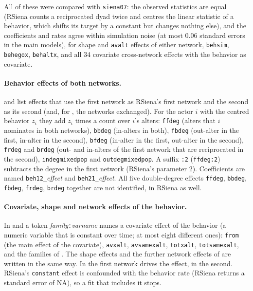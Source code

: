All of these were compared with \texttt{siena07}: the observed statistics are equal (RSiena counts a reciprocated dyad twice and centres the linear statistic of a behavior, which shifts its target by a constant but changes nothing else), and the coefficients and rates agree within simulation noise (at most 0.06 standard errors in the main models), for shape and \texttt{avalt} effects of either network, \texttt{behsim}, \texttt{behegox}, \texttt{behaltx}, and all 34 covariate cross-network effects with the behavior as covariate.

\paragraph{Behavior effects of both networks.}  and  list effects that use the first network as RSiena's first network and the second as its second (and, for , the networks exchanged). For the actor $i$ with the centred behavior $z_i$ they add $z_i$ times a count over $i$'s alters: \texttt{ffdeg} (alters that $i$ nominates in both networks), \texttt{bbdeg} (in-alters in both), \texttt{fbdeg} (out-alter in the first, in-alter in the second), \texttt{bfdeg} (in-alter in the first, out-alter in the second), \texttt{frdeg} and \texttt{brdeg} (out- and in-alters of the first network that are reciprocated in the second), \texttt{indegmixedpop} and \texttt{outdegmixedpop}. A suffix \texttt{:2} (\texttt{ffdeg:2}) subtracts the degree in the first network (RSiena's parameter 2). Coefficients are named \texttt{beh12\_}\emph{effect} and \texttt{beh21\_}\emph{effect}. All five double-degree effects \texttt{ffdeg}, \texttt{bbdeg}, \texttt{fbdeg}, \texttt{frdeg}, \texttt{brdeg} together are not identified, in RSiena as well.

\paragraph{Covariate, shape and network effects of the behavior.} In  and  a token \emph{family}\texttt{:}\emph{varname} names a covariate effect of the behavior (a numeric variable that is constant over time; at most eight different ones): \texttt{from} (the main effect of the covariate), \texttt{avxalt}, \texttt{avsamexalt}, \texttt{totxalt}, \texttt{totsamexalt}, and the families of . The shape effects  and the further network effects of  are written in the same way. In  the first network drives the effect, in  the second. RSiena's \texttt{constant} effect is confounded with the behavior rate (RSiena returns a standard error of NA), so a fit that includes it stops.

